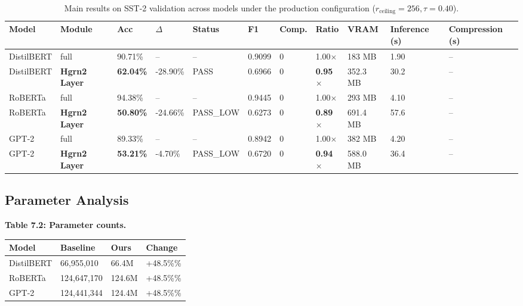 \begin{table}[t]
\centering
\small
\begin{tabular}{lllllllllll}
\toprule
\textbf{Model} & \textbf{Module} & \textbf{Acc} & \textbf{$\Delta$} & \textbf{Status} & \textbf{F1} & \textbf{Comp.} & \textbf{Ratio} & \textbf{VRAM} & \textbf{Inference (s)} & \textbf{Compression (s)} \\
\midrule
DistilBERT & full & 90.71\% & -- & -- & 0.9099 & 0 & 1.00$\times$ & 183 MB & 1.90 & -- \\
DistilBERT & \textbf{Hgrn2 Layer} & \textbf{62.04\%} & -28.90\% & PASS & 0.6966 & 0 & \textbf{0.95$\times$} & 352.3 MB & 30.2 & -- \\
RoBERTa & full & 94.38\% & -- & -- & 0.9445 & 0 & 1.00$\times$ & 293 MB & 4.10 & -- \\
RoBERTa & \textbf{Hgrn2 Layer} & \textbf{50.80\%} & -24.66\% & PASS_LOW & 0.6273 & 0 & \textbf{0.89$\times$} & 691.4 MB & 57.6 & -- \\
GPT-2 & full & 89.33\% & -- & -- & 0.8942 & 0 & 1.00$\times$ & 382 MB & 4.20 & -- \\
GPT-2 & \textbf{Hgrn2 Layer} & \textbf{53.21\%} & -4.70\% & PASS_LOW & 0.6720 & 0 & \textbf{0.94$\times$} & 588.0 MB & 36.4 & -- \\
\bottomrule
\end{tabular}
\caption{Main results on SST-2 validation across models under the production configuration ($r_{\mathrm{ceiling}}=256, \tau=0.40$).}
\label{tab:main_sst2}
\end{table}

\subsection{Parameter Analysis}

\textbf{Table 7.2: Parameter counts.}

\begin{table}[H]
\centering
\small
\begin{tabular}{llll}
\toprule
\textbf{Model} & \textbf{Baseline} & \textbf{Ours} & \textbf{Change} \\
\midrule
DistilBERT & 66,955,010 & 66.4M & +48.5\%\% \\
RoBERTa & 124,647,170 & 124.6M & +48.5\%\% \\
GPT-2 & 124,441,344 & 124.4M & +48.5\%\% \\
\bottomrule
\end{tabular}
\end{table}

